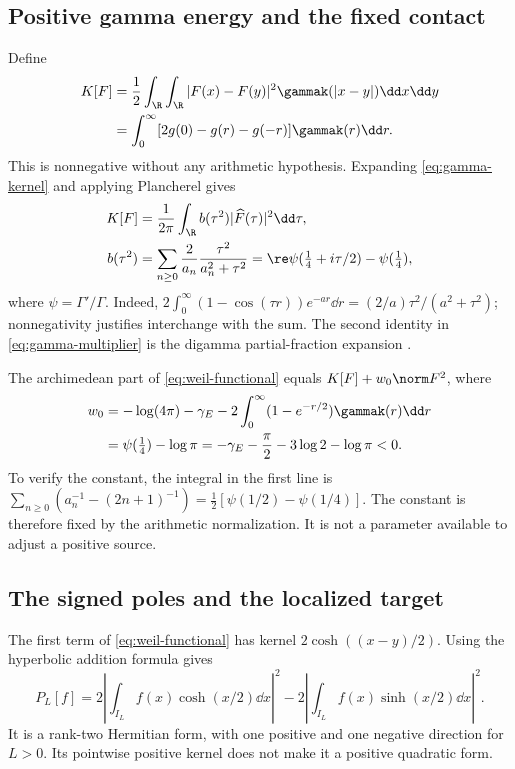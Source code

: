 \subsection{Positive gamma energy and the fixed contact}
Define
\begin{align}
 K[F]&=\frac12\int_\R\int_\R
    |F(x)-F(y)|^2\gammak(|x-y|)\dd x\dd y\notag\\
 &=\int_0^\infty[2g(0)-g(r)-g(-r)]\gammak(r)\dd r.
 \label{eq:gamma-energy}
\end{align}
This is nonnegative without any arithmetic hypothesis. Expanding
\eqref{eq:gamma-kernel} and applying Plancherel gives
\begin{align}
 K[F]&=\frac1{2\pi}\int_\R b(\tau^2)|\widehat F(\tau)|^2\dd\tau,
 \label{eq:gamma-fourier}\\
 b(\tau^2)&=\sum_{n\geq0}\frac2{a_n}
                 \frac{\tau^2}{a_n^2+\tau^2}
 =\re\psi(\tfrac14+i\tau/2)-\psi(\tfrac14),
 \label{eq:gamma-multiplier}
\end{align}
where $\psi=\Gamma'/\Gamma$. Indeed,
$2\int_0^\infty(1-\cos(\tau r))e^{-ar}\dd r
=(2/a)\tau^2/(a^2+\tau^2)$; nonnegativity justifies interchange with
the sum. The second identity in \eqref{eq:gamma-multiplier} is the
digamma partial-fraction expansion \cite{DLMF}.

The archimedean part of \eqref{eq:weil-functional} equals
$K[F]+w_0\norm F^2$, where
\begin{align}
 w_0&= -\log(4\pi)-\gamma_E
       -2\int_0^\infty(1-e^{-r/2})\gammak(r)\dd r\notag\\
 &=\psi(\tfrac14)-\log\pi
 =-\gamma_E-\frac\pi2-3\log2-\log\pi<0.
 \label{eq:contact}
\end{align}
To verify the constant, the integral in the first line is
$\sum_{n\geq0}(a_n^{-1}-(2n+1)^{-1})
=\tfrac12[\psi(1/2)-\psi(1/4)]$.
The constant is therefore fixed by the arithmetic normalization.
It is not a parameter available to adjust a positive source.

\subsection{The signed poles and the localized target}
The first term of \eqref{eq:weil-functional} has kernel
$2\cosh((x-y)/2)$. Using the hyperbolic addition formula gives
\begin{equation}\label{eq:poles}
 P_L[f]=2\left|\int_{I_L}f(x)\cosh(x/2)\dd x\right|^2
       -2\left|\int_{I_L}f(x)\sinh(x/2)\dd x\right|^2.
\end{equation}
It is a rank-two Hermitian form, with one positive and one negative
direction for $L>0$. Its pointwise positive kernel does not make it a
positive quadratic form.

